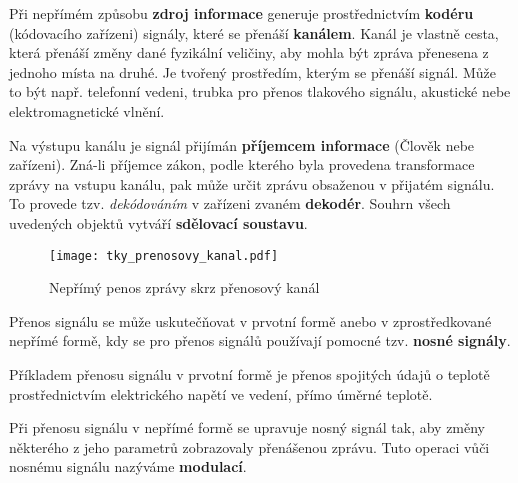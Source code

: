       Při nepřímém způsobu \textbf{zdroj informace} generuje prostřednictvím \textbf{kodéru} 
      (kódovacího zařízeni) signály, které se přenáší \textbf{kanálem}. Kanál je vlastně cesta, 
      která přenáší změny dané fyzikální veličiny, aby mohla být zpráva přenesena z jednoho místa 
      na druhé. Je tvořený prostředím, kterým se přenáší signál. Může to být např. telefonní 
      vedeni, trubka pro přenos tlakového signálu, akustické nebe elektromagnetické vlnění.
      
      Na výstupu kanálu je signál přijímán \textbf{příjemcem informace} (Člověk nebe zařízeni). 
      Zná-li příjemce zákon, podle kterého byla provedena transformace zprávy na vstupu kanálu, pak 
      může určit zprávu obsaženou v přijatém signálu. To provede tzv. \emph{dekódováním} v zařízeni 
      zvaném \textbf{dekodér}. Souhrn všech uvedených objektů vytváří \textbf{sdělovací soustavu}.

      \begin{figure}[ht!]
        \centering
        \texttt{[image: tky\_prenosovy\_kanal.pdf]}
        \caption{Nepřímý penos zprávy skrz přenosový kanál}
        \label{tky:fig002}
      \end{figure}

      Přenos signálu se může uskutečňovat v prvotní formě anebo v zprostředkované nepřímé formě, 
      kdy se pro přenos signálů používají pomocné tzv. \textbf{nosné signály}.
      
      Příkladem přenosu signálu v prvotní formě je přenos spojitých údajů o teplotě     
      prostřednictvím elektrického napětí ve vedení, přímo úměrné teplotě. 
      
      Při přenosu signálu v nepřímé formě se upravuje nosný signál tak, aby změny některého z jeho 
      parametrů zobrazovaly přenášenou zprávu. Tuto operaci vůči nosnému signálu nazýváme 
      \textbf{modulací}.
      
      
\printbibliography[title={Seznam literatury}, heading=subbibliography]
